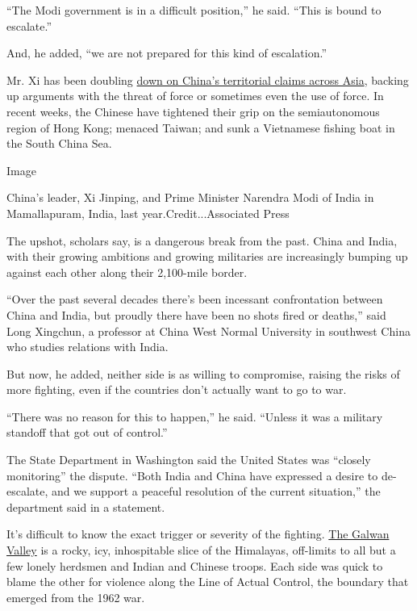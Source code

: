 ``The Modi government is in a difficult position,'' he said. ``This is
bound to escalate.''

And, he added, ``we are not prepared for this kind of escalation.''

Mr. Xi has been doubling
\href{https://www.nytimes3xbfgragh.onion/2020/05/24/world/asia/china-hong-kong-taiwan.html}{down
on China's territorial claims across Asia}, backing up arguments with
the threat of force or sometimes even the use of force. In recent weeks,
the Chinese have tightened their grip on the semiautonomous region of
Hong Kong; menaced Taiwan; and sunk a Vietnamese fishing boat in the
South China Sea.

Image

China's leader, Xi Jinping, and Prime Minister Narendra Modi of India in
Mamallapuram, India, last year.Credit...Associated Press

The upshot, scholars say, is a dangerous break from the past. China and
India, with their growing ambitions and growing militaries are
increasingly bumping up against each other along their 2,100-mile
border.

``Over the past several decades there's been incessant confrontation
between China and India, but proudly there have been no shots fired or
deaths,'' said Long Xingchun, a professor at China West Normal
University in southwest China who studies relations with India.

But now, he added, neither side is as willing to compromise, raising the
risks of more fighting, even if the countries don't actually want to go
to war.

``There was no reason for this to happen,'' he said. ``Unless it was a
military standoff that got out of control.''

The State Department in Washington said the United States was ``closely
monitoring'' the dispute. ``Both India and China have expressed a desire
to de-escalate, and we support a peaceful resolution of the current
situation,'' the department said in a statement.

It's difficult to know the exact trigger or severity of the fighting.
\href{https://www.indiatoday.in/india/story/india-china-border-faceoff-exclusive-maps-pangong-tso-ladakh-galwan-1688727-2020-06-13}{The
Galwan Valley} is a rocky, icy, inhospitable slice of the Himalayas,
off-limits to all but a few lonely herdsmen and Indian and Chinese
troops. Each side was quick to blame the other for violence along the
Line of Actual Control, the boundary that emerged from the 1962 war.

